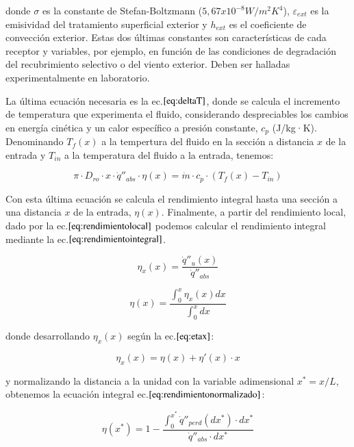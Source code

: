donde \(\sigma\) es la constante de Stefan-Boltzmann ($5,67x10^{-8} W/m^2K^4$), \(\varepsilon_{ext}\) es la emisividad del tratamiento superficial exterior y \(h_{ext}\) es el coeficiente de convección exterior. Estas dos últimas constantes son características de cada receptor y variables, por ejemplo, en función de las condiciones de degradación del recubrimiento selectivo o del viento exterior. Deben ser halladas experimentalmente en laboratorio.

La última ecuación necesaria es la ec.\(\eqref{eq:deltaT}\), donde se calcula el incremento de temperatura que experimenta el fluido, considerando despreciables los cambios en energía cinética y un calor específico a presión constante, \(c_{p}\) (J/kg·K). Denominando \(T_{f}(x)\) a la tempertura del fluido en la sección a distancia \(x\) de la entrada y \(T_{in}\) a la temperatura del fluido a la entrada, tenemos:

\begin{equation}
    \pi \cdot D_{ro} \cdot x \cdot \dot q''_{abs} \cdot \eta(x)= \dot{m} \cdot c_{p} \cdot (T_{f}(x)-T_{in}) \label{eq:deltaT}
\end{equation}

Con esta última ecuación se calcula el rendimiento integral hasta una sección a una distancia \(x\) de la entrada, \(\eta(x)\). Finalmente, a partir del rendimiento local, dado por la ec.\(\eqref{eq:rendimientolocal}\) podemos calcular el rendimiento integral mediante la ec.\(\eqref{eq:rendimientointegral}\).

\begin{equation}
    \eta_{x}(x) = \frac{\dot q''_{u}(x)}{\dot q''_{abs}} \label{eq:rendimientolocal}
\end{equation}

\begin{equation}
    \eta(x) = \frac{\int_{0}^{x}\eta_{x}(x)dx}{\int_{0}^{x}dx} \label{eq:rendimientointegral}
\end{equation}

donde desarrollando \(\eta_{x}(x)\) según la ec.\(\eqref{eq:etax}\):

\begin{equation}
    \eta_{x}(x) = \eta(x) + \eta'(x)\cdot x  \label{eq:etax}
\end{equation}

y normalizando la distancia a la unidad con la variable adimensional \(x^{*}=x/L\), obtenemos la ecuación integral ec.\(\eqref{eq:rendimientonormalizado}\):

\begin{equation}
    \eta(x^{*}) = 1 - \frac{\int_{0}^{x^{*}} \dot q''_{perd}(dx^{*})\cdot dx^{*}}{\dot q''_{abs}\cdot dx^{*}} \label{eq:rendimientonormalizado}
\end{equation}

